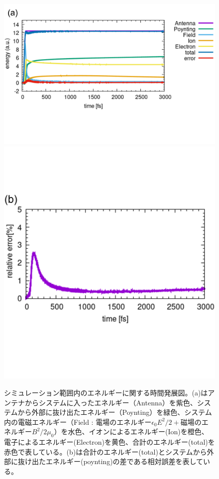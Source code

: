 \documentclass[a4paper,11pt,titlepage]{jarticle}
\numberwithin{equation}{section} %
\begin{document}
  \begin{figure}[H]
    \begin{center}
      \includegraphics[scale=0.5]{./image/4-10-10rod_dynamics.png}
      \includegraphics[scale=0.5]{./image/4-11-10rod_dynamics_error.png}
      \label{fig:4-7}
      \caption{シミュレーション範囲内のエネルギーに関する時間発展図。(a)はアンテナからシステムに入ったエネルギー（Antenna）を紫色、システムから外部に抜け出たエネルギー（Poynting）を緑色、システム内の電磁エネルギー（Field : 電場のエネルギー$\epsilon_0E^{2}/2　+$磁場のエネルギー$B^{2}/2\mu_0$）を水色、イオンによるエネルギー(Ion)を橙色、電子によるエネルギー(Electron)を黄色、合計のエネルギー(total)を赤色で表している。(b)は合計のエネルギー(total)とシステムから外部に抜け出たエネルギー(poynting)の差である相対誤差を表している。}
    \end{center}
  \end{figure}
  
\end{document}
